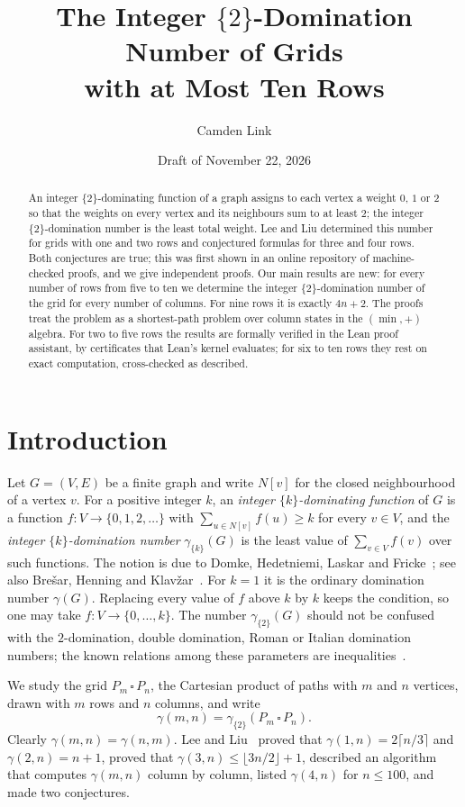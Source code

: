 \documentclass[12pt]{article}
\title{The Integer $\{2\}$-Domination Number of Grids\\ with at Most Ten Rows}
\author{Camden Link}
\date{Draft of November 22, 2026}
\newcommand{\fl}[1]{\lfloor #1 \rfloor}
\newcommand{\ce}[1]{\lceil #1 \rceil}
\newcommand{\g}{\gamma_{\{2\}}}
\newcommand{\G}[2]{P_{#1}\,\square\,P_{#2}}
\theoremstyle{plain}
\theoremstyle{remark}
\begin{document}
\maketitle

\begin{abstract}
An integer $\{2\}$-dominating function of a graph assigns to each vertex a weight $0$, $1$ or
$2$ so that the weights on every vertex and its neighbours sum to at least $2$; the integer
$\{2\}$-domination number is the least total weight. Lee and Liu determined this number for
grids with one and two rows and conjectured formulas for three and four rows. Both conjectures
are true; this was first shown in an online repository of machine-checked proofs, and we give
independent proofs. Our main results are new: for every number of rows from five to ten we
determine the integer $\{2\}$-domination number of the grid for every number of columns. For
nine rows it is exactly $4n+2$. The proofs treat the problem as a shortest-path problem over
column states in the $(\min,+)$ algebra. For two to five rows the results are formally verified
in the Lean proof assistant, by certificates that Lean's kernel evaluates; for six to ten rows
they rest on exact computation, cross-checked as described.
\end{abstract}

\section{Introduction}

Let $G=(V,E)$ be a finite graph and write $N[v]$ for the closed neighbourhood of a vertex $v$.
For a positive integer $k$, an \emph{integer $\{k\}$-dominating function} of $G$ is a function
$f\colon V\to\{0,1,2,\dots\}$ with $\sum_{u\in N[v]}f(u)\ge k$ for every $v\in V$, and the
\emph{integer $\{k\}$-domination number} $\gamma_{\{k\}}(G)$ is the least value of
$\sum_{v\in V}f(v)$ over such functions. The notion is due to Domke, Hedetniemi, Laskar and
Fricke~\cite{dhlf}; see also Bre\v{s}ar, Henning and Klav\v{z}ar~\cite{bhk}. For $k=1$ it is the
ordinary domination number $\gamma(G)$. Replacing every value of $f$ above $k$ by $k$ keeps the
condition, so one may take $f\colon V\to\{0,\dots,k\}$. The number $\g(G)$ should not be
confused with the $2$-domination, double domination, Roman or Italian domination numbers; the
known relations among these parameters are inequalities~\cite{bbgms}.

We study the grid $\G mn$, the Cartesian product of paths with $m$ and $n$ vertices, drawn with
$m$ rows and $n$ columns, and write
\[
\gamma(m,n)=\g(\G mn).
\]
Clearly $\gamma(m,n)=\gamma(n,m)$. Lee and Liu~\cite{ll} proved that $\gamma(1,n)=2\ce{n/3}$ and
$\gamma(2,n)=n+1$, proved that $\gamma(3,n)\le\fl{3n/2}+1$, described an algorithm that computes
$\gamma(m,n)$ column by column, listed $\gamma(4,n)$ for $n\le100$, and made two conjectures.
\end{document}
